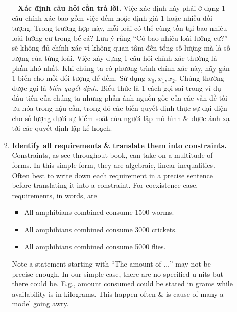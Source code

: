\documentclass{article}
\begin{document}
\begin{itemize}
\begin{itemize}
\begin{enumerate}
            -- {\bf Xác định câu hỏi cần trả lời.} Việc xác định này phải ở dạng 1 câu chính xác bao gồm việc đếm hoặc định giá 1 hoặc nhiều đối tượng. Trong trường hợp này, mỗi loài có thể cùng tồn tại bao nhiêu loài lưỡng cư trong bể cá? Lưu ý rằng ``Có bao nhiêu loài lưỡng cư?'' sẽ không đủ chính xác vì không quan tâm đến tổng số lượng mà là số lượng của từng loài. Việc xây dựng 1 câu hỏi chính xác thường là phần khó nhất. Khi chúng ta có phương trình chính xác này, hãy gán 1 biến cho mỗi đối tượng để đếm. Sử dụng $x_0,x_1,x_2$. Chúng thường được gọi là {\it biến quyết định}. Biểu thức là 1 cách gọi sai trong ví dụ đầu tiên của chúng ta nhưng phản ánh nguồn gốc của các vấn đề tối ưu hóa trong hậu cần, trong đó các biến quyết định thực sự đại diện cho số lượng dưới sự kiểm soát của người lập mô hình \& được ánh xạ tới các quyết định lập kế hoạch.
            \item {\bf Identify all requirements \& translate them into constraints.} Constraints, as see throughout book, can take on a multitude of forms. In this simple form, they are algebraic, linear inequalities. Often best to write down each requirement in a precise sentence before translating it into a constraint. For coexistence case, requirements, in words, are
            \begin{itemize}
                \item All amphibians combined consume 1500 worms.
                \item All amphibians combined consume 3000 crickets.
                \item All amphibians combined consume 5000 flies.
            \end{itemize}
            Note a statement starting with ``The amount of $\ldots$'' may not be precise enough. In our simple case, there are no specified u nits but there could be. E.g., amount consumed could be stated in grams while availability is in kilograms. This happen often \& is cause of many a model going awry.


\end{enumerate}
\end{itemize}
\end{itemize}
\end{document}
